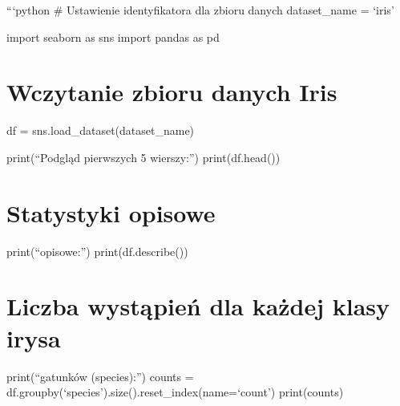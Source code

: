 \documentclass[
  letterpaper,
  DIV=11,
  numbers=noendperiod]{scrartcl}
\begin{document}
```python \# Ustawienie identyfikatora dla zbioru danych dataset\_name =
`iris'

import seaborn as sns import pandas as pd

\section{Wczytanie zbioru danych
Iris}\label{wczytanie-zbioru-danych-iris}

df = sns.load\_dataset(dataset\_name)

print(``Podgląd pierwszych 5 wierszy:'') print(df.head())

\section{Statystyki opisowe}\label{statystyki-opisowe}

print(``\nStatystyki opisowe:'') print(df.describe())

\section{Liczba wystąpień dla każdej klasy
irysa}\label{liczba-wystux105pieux144-dla-kaux17cdej-klasy-irysa}

print(`` gatunków (species):'') counts =
df.groupby(`species').size().reset\_index(name=`count') print(counts)
\end{document}
